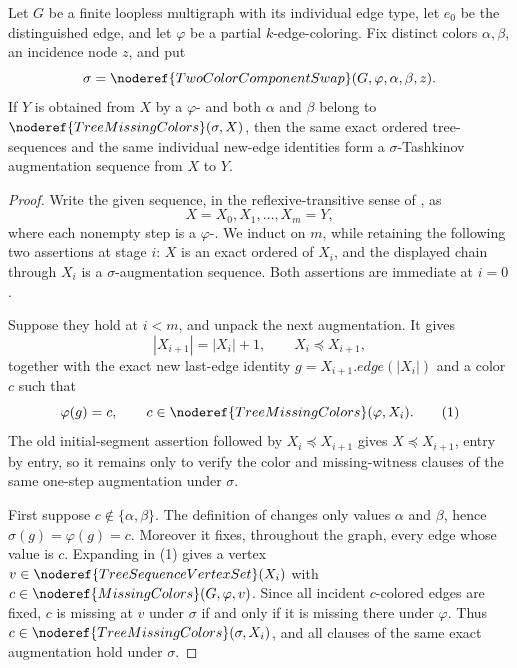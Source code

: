 \begin{lemma}
Let \(G\) be a finite loopless multigraph with its individual edge type,
let \(e_0\) be the distinguished edge, and let \(\varphi\) be a partial
\(k\)-edge-coloring.  Fix distinct colors \(\alpha,\beta\), an incidence
node \(z\), and put
\[
 \sigma=\noderef{TwoColorComponentSwap}(G,\varphi,\alpha,\beta,z).
\]
If \(Y\) is obtained from \(X\) by a
\(\varphi\)- and both
\(\alpha\) and \(\beta\) belong to
\(\noderef{TreeMissingColors}(\sigma,X)\), then the same exact ordered
tree-sequences and the same individual new-edge identities form a
\(\sigma\)-Tashkinov augmentation sequence from \(X\) to \(Y\).
\end{lemma}
\begin{proof}
Write the given sequence, in the reflexive-transitive sense of
, as
\[
                 X=X_0,X_1,\ldots,X_m=Y,
\]
where each nonempty step is a
\(\varphi\)-.  We induct on \(m\), while
retaining the following two assertions at stage \(i\): \(X\) is an exact
ordered  of \(X_i\), and the displayed
chain through \(X_i\) is a \(\sigma\)-augmentation sequence.  Both
assertions are immediate at \(i=0\).

Suppose they hold at \(i<m\), and unpack the next augmentation.  It gives
\[
 |X_{i+1}|=|X_i|+1,
 \qquad X_i\preccurlyeq X_{i+1},
\]
together with the exact new last-edge identity
\(g=X_{i+1}.\mathit{edge}(|X_i|)\) and a color \(c\) such that
\[
                 \varphi(g)=c,
        \qquad c\in\noderef{TreeMissingColors}(\varphi,X_i).  \tag{1}
\]
The old initial-segment assertion followed by
\(X_i\preccurlyeq X_{i+1}\) gives
\(X\preccurlyeq X_{i+1}\), entry by entry, so it remains only to verify
the color and missing-witness clauses of the same one-step augmentation
under \(\sigma\).

First suppose \(c\notin\{\alpha,\beta\}\).  The definition of
 changes only values \(\alpha\) and
\(\beta\), hence \(\sigma(g)=\varphi(g)=c\).  Moreover it fixes, throughout
the graph, every edge whose value is \(c\).  Expanding
 in (1) gives a vertex
\(v\in\noderef{TreeSequenceVertexSet}(X_i)\) with
\(c\in\noderef{MissingColors}(G,\varphi,v)\).  Since all incident
\(c\)-colored edges are fixed, \(c\) is missing at \(v\) under \(\sigma\)
if and only if it is missing there under \(\varphi\).  Thus
\(c\in\noderef{TreeMissingColors}(\sigma,X_i)\), and all clauses of the
same exact augmentation hold under \(\sigma\).


\end{proof}
